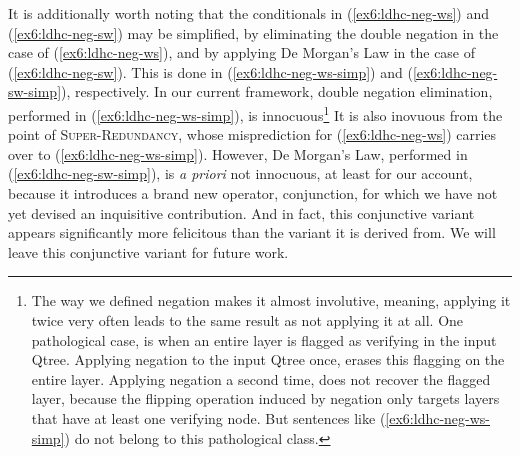 It is additionally worth noting that the conditionals in (\ref{ex6:ldhc-neg-ws}) and (\ref{ex6:ldhc-neg-sw}) may be simplified, by eliminating the double negation in the case of (\ref{ex6:ldhc-neg-ws}), and by applying De Morgan's Law in the case of (\ref{ex6:ldhc-neg-sw}). This is done in (\ref{ex6:ldhc-neg-ws-simp}) and (\ref{ex6:ldhc-neg-sw-simp}), respectively. In our current framework, double negation elimination, performed in (\ref{ex6:ldhc-neg-ws-simp}), is innocuous\footnote{The way we defined negation makes it almost involutive, meaning, applying it twice very often leads to the same result as not applying it at all. One pathological case, is when an entire layer is flagged as verifying in the input Qtree. Applying negation to the input Qtree once, erases this flagging on the entire layer. Applying negation a second time, does not recover the flagged layer, because the flipping operation induced by negation only targets layers that have at least one verifying node. But sentences like (\ref{ex6:ldhc-neg-ws-simp}) do not belong to this pathological class.} It is also inovuous from the point of \textsc{Super-Redundancy}, whose misprediction for (\ref{ex6:ldhc-neg-ws}) carries over to (\ref{ex6:ldhc-neg-ws-simp}). However, De Morgan's Law, performed in (\ref{ex6:ldhc-neg-sw-simp}), is \textit{a priori} not innocuous, at least for our account, because it introduces a brand new operator, conjunction, for which we have not yet devised an inquisitive contribution. And in fact, this conjunctive variant appears significantly more felicitous than the variant it is derived from. We will leave this conjunctive variant for future work.

\begin{exe}
	\ex 
	\begin{xlist}
		\label{ex6:ldhc-neg-ws-simp}
		\label{ex6:ldhc-neg-sw-simp}
	\end{xlist}
\end{exe}


